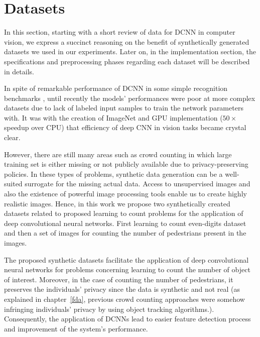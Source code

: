 
\section{Datasets} 

In this section, starting with a short review of data for DCNN in computer vision, we express a succinct reasoning on the benefit of synthetically generated datasets we used in our experiments. Later on, in the implementation section, the specifications and preprocessing phases regarding each dataset will be described in details. 


In spite of remarkable  performance of DCNN in some simple recognition benchmarks \cite{ciresan2015multi, cirecsan2012multi}, until recently the models' performances were poor at more complex datasets  \cite{griffin2007caltech} due to lack of labeled input samples to train the network parameters with. It was with the creation of ImageNet \cite{deng2009imagenet} and GPU implementation \cite{krizhevsky2012imagenet} ($50\times$ speedup over CPU) that efficiency of deep CNN in vision tasks became crystal clear.

However, there are still many areas such as crowd counting in which large training set is either missing or not publicly available due to privacy-preserving policies. In these types of problems, synthetic data generation can be a well-suited surrogate for the missing actual data.  Access to unsupervised images and also the existence of powerful image processing tools enable us to create highly realistic images. Hence, in this work we propose two synthetically created datasets related to proposed learning to count problems for the application of deep convolutional neural networks. First learning to count even-digits dataset and then a set of images for counting the number of pedestrians present in the images.   

The proposed synthetic datasets facilitate the application of deep convolutional neural networks for problems concerning learning to count the number of object of interest. Moreover, in the case of counting the number of pedestrians, it preserves the individuals' privacy since the data is synthetic and not real (as explained in chapter~\ref{fda}, previous crowd counting approaches were somehow infringing individuals' privacy by using object tracking algorithms.). Consequently, the application of DCNNs lead to easier feature detection process and improvement of the system's performance. 

